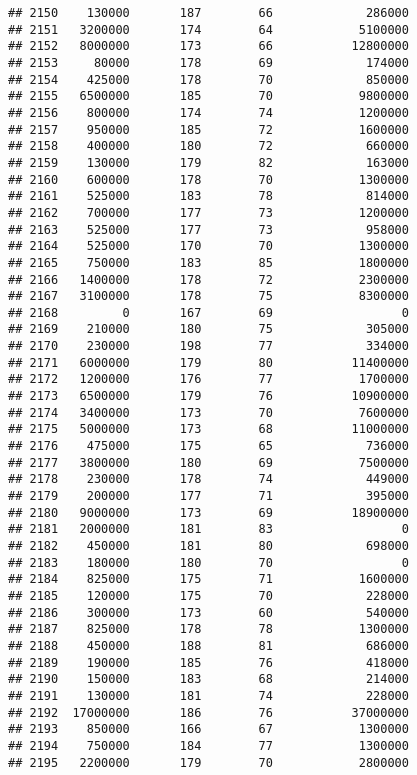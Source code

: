 \documentclass[
]{article}
\begin{document}
\begin{verbatim}
## 2150    130000       187        66             286000
## 2151   3200000       174        64            5100000
## 2152   8000000       173        66           12800000
## 2153     80000       178        69             174000
## 2154    425000       178        70             850000
## 2155   6500000       185        70            9800000
## 2156    800000       174        74            1200000
## 2157    950000       185        72            1600000
## 2158    400000       180        72             660000
## 2159    130000       179        82             163000
## 2160    600000       178        70            1300000
## 2161    525000       183        78             814000
## 2162    700000       177        73            1200000
## 2163    525000       177        73             958000
## 2164    525000       170        70            1300000
## 2165    750000       183        85            1800000
## 2166   1400000       178        72            2300000
## 2167   3100000       178        75            8300000
## 2168         0       167        69                  0
## 2169    210000       180        75             305000
## 2170    230000       198        77             334000
## 2171   6000000       179        80           11400000
## 2172   1200000       176        77            1700000
## 2173   6500000       179        76           10900000
## 2174   3400000       173        70            7600000
## 2175   5000000       173        68           11000000
## 2176    475000       175        65             736000
## 2177   3800000       180        69            7500000
## 2178    230000       178        74             449000
## 2179    200000       177        71             395000
## 2180   9000000       173        69           18900000
## 2181   2000000       181        83                  0
## 2182    450000       181        80             698000
## 2183    180000       180        70                  0
## 2184    825000       175        71            1600000
## 2185    120000       175        70             228000
## 2186    300000       173        60             540000
## 2187    825000       178        78            1300000
## 2188    450000       188        81             686000
## 2189    190000       185        76             418000
## 2190    150000       183        68             214000
## 2191    130000       181        74             228000
## 2192  17000000       186        76           37000000
## 2193    850000       166        67            1300000
## 2194    750000       184        77            1300000
## 2195   2200000       179        70            2800000

\end{verbatim}
\end{document}
